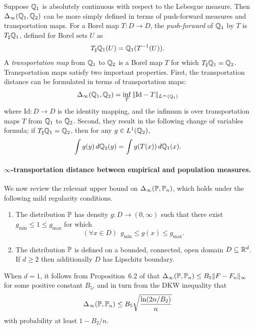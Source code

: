 Suppose $\mathbb{Q}_1$ is absolutely continuous with respect to the Lebesgue measure. Then $\Delta_{\infty}(\mathbb{Q}_1,\mathbb{Q}_2)$ can be more simply defined in terms of push-forward measures and transportation maps. For a Borel map $T: D \to D$, the \emph{push-forward} of $\mathbb{Q}_1$ by $T$ is $T_{\sharp}\mathbb{Q}_1$, defined for Borel sets $U$ as 
\begin{equation*}
T_{\sharp}\mathbb{Q}_1(U) = \mathbb{Q}_1(T^{-1}(U)).
\end{equation*}
A \emph{transportation map} from $\mathbb{Q}_1$ to $\mathbb{Q}_2$ is a Borel map $T$ for which $T_{\sharp}\mathbb{Q}_1 = \mathbb{Q}_2$. Transportation maps satisfy two important properties. First, the transportation distance can be formulated in terms of transportation maps:
\begin{equation*}
\Delta_{\infty}(\mathbb{Q}_1,\mathbb{Q}_2) = \inf_{T} \|\mathrm{Id} - T\|_{L^{\infty}(\mathbb{Q}_1)}
\end{equation*}
where $\mathrm{Id}: D \to D$ is the identity mapping, and the infimum is over transportation maps $T$ from $\mathbb{Q}_1$ to $\mathbb{Q}_2$. Second, they result in the following change of variables formula; if $T_{\sharp}\mathbb{Q}_1 = \mathbb{Q}_2$, then for any $g \in L^1(\mathbb{Q}_2)$,
\begin{equation}
\label{eqn:transportation_map_change_of_variable}
\int g(y) \,d\mathbb{Q}_2(y) = \int g(T(x)) \,d\mathbb{Q}_1(x).
\end{equation} 

\paragraph{$\infty$-transportation distance between empirical and population measures.}
We now review the relevant upper bound on $\Delta_{\infty}(\mathbb{P},\mathbb{P}_n)$, which holds under the following mild regularity conditions.
\begin{enumerate}[label=(A\arabic*)]
	\item 
	\label{asmp:bounded_density} 
	The distribution $\mathbb{P}$ has density $g: D \to (0,\infty)$ such that there exist $g_{\min} \leq 1 \leq g_{\max}$ for which
	\begin{equation*}
	(\forall x \in D)~~ g_{\min} \leq g(x) \leq g_{\max}.
	\end{equation*}
	\item 
	\label{asmp:domain} 
	The distribution $\mathbb{P}$ is defined on a bounded, connected, open domain $D \subseteq \mathbb{R}^d$. If $d \geq 2$ then additionally $D$ has Lipschitz boundary.
\end{enumerate}
When $d = 1$, it follows from Proposition~6.2 of \cite{dudley1968} that $\Delta_{\infty}(\mathbb{P},\mathbb{P}_n) \leq B_5 \|F - F_n\|_{\infty}$ for some positive constant $B_5$, and in turn from the DKW inequality that
\begin{equation}
\label{eqn:ot_distance_1d}
\Delta_{\infty}(\mathbb{P},\mathbb{P}_n) \leq B_5 \sqrt{\frac{\ln(2n/B_2)}{n}}
\end{equation}
with probability at least $1 - B_2/n$.

